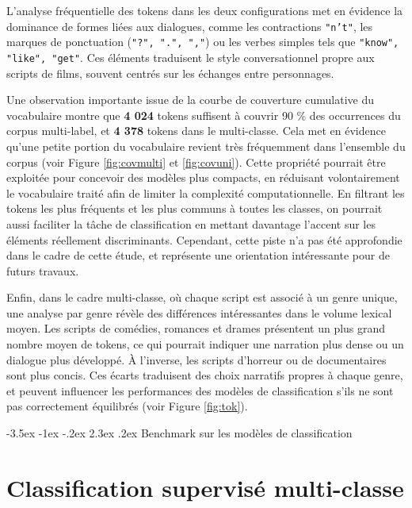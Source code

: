\documentclass[12pt]{report}
\makeatletter
\renewcommand{\chapter}{\@startsection{chapter}{0}{\z@}
  {-3.5ex \@plus -1ex \@minus -.2ex}
  {2.3ex \@plus.2ex}
  {\normalfont\LARGE\bfseries}}
\makeatother
\begin{document}
L’analyse fréquentielle des tokens dans les deux configurations met en évidence la dominance de formes liées aux dialogues, comme les contractions \texttt{"n't"}, les marques de ponctuation (\texttt{"?", ".", ","}) ou les verbes simples tels que \texttt{"know", "like", "get"}. Ces éléments traduisent le style conversationnel propre aux scripts de films, souvent centrés sur les échanges entre personnages. 

Une observation importante issue de la courbe de couverture cumulative du vocabulaire montre que \textbf{4 024} tokens suffisent à couvrir 90 \% des occurrences du corpus multi-label, et \textbf{4 378} tokens dans le multi-classe. Cela met en évidence qu'une petite portion du vocabulaire revient très fréquemment dans l'ensemble du corpus (voir Figure \ref{fig:covmulti} et \ref{fig:covuni}). Cette propriété pourrait être exploitée pour concevoir des modèles plus compacts, en réduisant volontairement le vocabulaire traité afin de limiter la complexité computationnelle. En filtrant les tokens les plus fréquents et les plus communs à toutes les classes, on pourrait aussi faciliter la tâche de classification en mettant davantage l’accent sur les éléments réellement discriminants. Cependant, cette piste n’a pas été approfondie dans le cadre de cette étude, et représente une orientation intéressante pour de futurs travaux.  

Enfin, dans le cadre multi-classe, où chaque script est associé à un genre unique, une analyse par genre révèle des différences intéressantes dans le volume lexical moyen. Les scripts de comédies, romances et drames présentent un plus grand nombre moyen de tokens, ce qui pourrait indiquer une narration plus dense ou un dialogue plus développé. À l’inverse, les scripts d’horreur ou de documentaires sont plus concis. Ces écarts traduisent des choix narratifs propres à chaque genre, et peuvent influencer les performances des modèles de classification s’ils ne sont pas correctement équilibrés (voir Figure \ref{fig:tok}).

\chapter{Benchmark sur les modèles de classification}

\section{Classification supervisé multi-classe}
\end{document}

